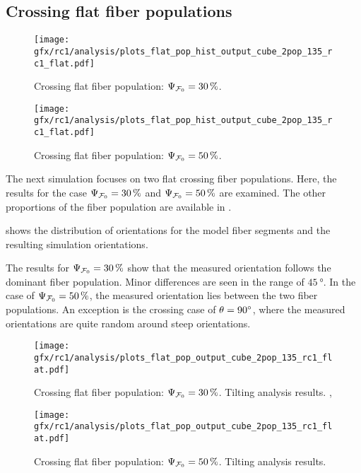 \subsection{Crossing flat fiber populations}
\label{sec:resCrossFlat}
%
\begin{figure}[!p]
\centering
\texttt{[image: gfx/rc1/analysis/plots\_flat\_pop\_hist\_output\_cube\_2pop\_135\_rc1\_flat.pdf]}
\caption{Crossing flat fiber population: $\textnormal{$\Psi_{\textnormal{$\mathcal{F}_0$}}$}=\SI{30}{\percent}$.}
\label{fig:flat_03_fiber_pop_hist}
% 
\vspace{2em}
\texttt{[image: gfx/rc1/analysis/plots\_flat\_pop\_hist\_output\_cube\_2pop\_135\_rc1\_flat.pdf]}
\caption{Crossing flat fiber population: $\textnormal{$\Psi_{\textnormal{$\mathcal{F}_0$}}$}=\SI{50}{\percent}$.}
\label{fig:flat_05_fiber_pop_hist}
\end{figure}
%
The next simulation focuses on two flat crossing fiber populations.
Here, the results for the case $\textnormal{$\Psi_{\textnormal{$\mathcal{F}_0$}}$} = \SI{30}{\percent}$ and $\textnormal{$\Psi_{\textnormal{$\mathcal{F}_0$}}$} = \SI{50}{\percent}$ are examined.
The other proportions of the fiber population are available in .
\par
%
 shows the distribution of orientations for the model fiber segments and the resulting simulation orientations.
\par
% 
The results for $\textnormal{$\Psi_{\textnormal{$\mathcal{F}_0$}}$} = \SI{30}{\percent}$ show that the measured orientation follows the dominant fiber population.
Minor differences are seen in the range of $\SI{45}{\degree}$.
In the case of $\textnormal{$\Psi_{\textnormal{$\mathcal{F}_0$}}$} = \SI{50}{\percent}$, the measured orientation lies between the two fiber populations.
An exception is the crossing case of $\textnormal{$\theta$}=\SI{90}{\degree}$, where the measured orientations are quite random around steep orientations.
\par
%
\begin{figure}[!p]
\centering
\texttt{[image: gfx/rc1/analysis/plots\_flat\_pop\_output\_cube\_2pop\_135\_rc1\_flat.pdf]}
\caption{Crossing flat fiber population: $\textnormal{$\Psi_{\textnormal{$\mathcal{F}_0$}}$}=\SI{30}{\percent}$. Tilting analysis results. ,  }
\label{fig:flat_03_fiber_pop_rofl}
\end{figure}
%
\begin{figure}[!p]
\centering
\texttt{[image: gfx/rc1/analysis/plots\_flat\_pop\_output\_cube\_2pop\_135\_rc1\_flat.pdf]}
\caption{Crossing flat fiber population: $\textnormal{$\Psi_{\textnormal{$\mathcal{F}_0$}}$}=\SI{50}{\percent}$. Tilting analysis results.}
\label{fig:flat_05_fiber_pop_rofl}
\end{figure}
